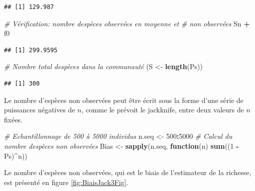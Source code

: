 \documentclass[
  11pt,
  french,
  a4paper,
  extrafontsizes,onecolumn,openright
  ]{memoir}
\newenvironment{Shaded}{\begin{snugshade}}{\end{snugshade}}
\newcommand{\CommentTok}[1]{\textcolor[rgb]{0.56,0.35,0.01}{\textit{#1}}}
\newcommand{\ControlFlowTok}[1]{\textcolor[rgb]{0.13,0.29,0.53}{\textbf{#1}}}
\newcommand{\DecValTok}[1]{\textcolor[rgb]{0.00,0.00,0.81}{#1}}
\newcommand{\FunctionTok}[1]{\textcolor[rgb]{0.13,0.29,0.53}{\textbf{#1}}}
\newcommand{\NormalTok}[1]{#1}
\newcommand{\OtherTok}[1]{\textcolor[rgb]{0.56,0.35,0.01}{#1}}
\newcommand{\SpecialCharTok}[1]{\textcolor[rgb]{0.81,0.36,0.00}{\textbf{#1}}}
\begin{document}
\begin{verbatim}
## [1] 129.987
\end{verbatim}

\begin{Shaded}
\begin{Highlighting}[]
\CommentTok{\# Vérification: nombre d\textquotesingle{}espèces observées en moyenne et}
\CommentTok{\# non observées}
\NormalTok{Sn }\SpecialCharTok{+}\NormalTok{ f0}
\end{Highlighting}
\end{Shaded}

\begin{verbatim}
## [1] 299.9595
\end{verbatim}

\begin{Shaded}
\begin{Highlighting}[]
\CommentTok{\# Nombre total d\textquotesingle{}espèces dans la communauté}
\NormalTok{(S }\OtherTok{\textless{}{-}} \FunctionTok{length}\NormalTok{(Ps))}
\end{Highlighting}
\end{Shaded}

\begin{verbatim}
## [1] 300
\end{verbatim}

\normalsize

Le nombre d'espèces non observées peut être écrit sous la forme d'une série de puissances négatives de \(n\), comme le prévoit le jackknife, entre deux valeurs de \(n\) fixées.

\scriptsize

\begin{Shaded}
\begin{Highlighting}[]
\CommentTok{\# Echantillonnage de 500 à 5000 individus}
\NormalTok{n.seq }\OtherTok{\textless{}{-}} \DecValTok{500}\SpecialCharTok{:}\DecValTok{5000}
\CommentTok{\# Calcul du nombre d\textquotesingle{}espèces non observées}
\NormalTok{Bias }\OtherTok{\textless{}{-}} \FunctionTok{sapply}\NormalTok{(n.seq, }\ControlFlowTok{function}\NormalTok{(n) }\FunctionTok{sum}\NormalTok{((}\DecValTok{1} \SpecialCharTok{{-}}\NormalTok{ Ps)}\SpecialCharTok{\^{}}\NormalTok{n))}
\end{Highlighting}
\end{Shaded}

\normalsize

Le nombre d'espèces non observées, qui est le biais de l'estimateur de la richesse, est présenté en figure \ref{fig:BiaisJack3Fig}.
\end{document}
